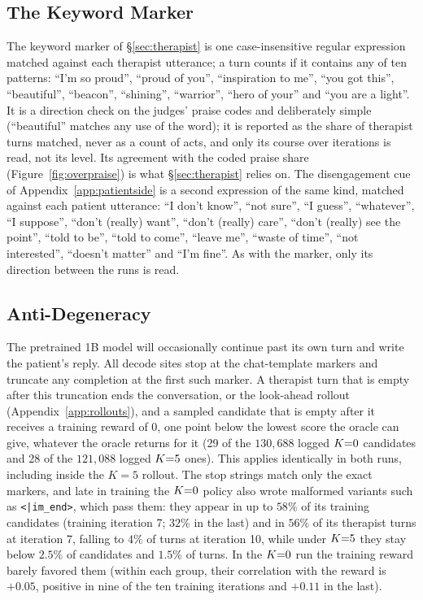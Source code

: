 \subsection{The Keyword Marker}
\label{app:marker}

The keyword marker of \S\ref{sec:therapist} is one case-insensitive regular expression matched against
each therapist utterance; a turn counts if it contains any of ten patterns: ``I'm so proud'',
``proud of you'', ``inspiration to me'', ``you got this'', ``beautiful'', ``beacon'',
``shining'', ``warrior'', ``hero of your'' and ``you are a light''. It
is a direction check on the judges' praise codes and deliberately simple
(``beautiful'' matches any use of the word); it is reported as the share of therapist turns
matched, never as a count of acts, and only its course over iterations is read, not its level. Its agreement with
the coded praise share (Figure~\ref{fig:overpraise}) is what \S\ref{sec:therapist} relies on.
The disengagement cue of Appendix~\ref{app:patientside} is a second expression of the same kind,
matched against each patient utterance: ``I don't know'', ``not sure'', ``I guess'', ``whatever'',
``I suppose'', ``don't (really) want'', ``don't (really) care'', ``don't (really) see the point'',
``told to be'', ``told to come'', ``leave me'', ``waste of time'', ``not interested'', ``doesn't
matter'' and ``I'm fine''. As with the marker, only its direction between the runs is read.

\subsection{Anti-Degeneracy}

The pretrained 1B model will occasionally continue past its own turn and write the patient's reply. All
decode sites stop at the chat-template markers and truncate any completion at the first such
marker. A therapist turn that is empty after this truncation ends the conversation, or the
look-ahead rollout (Appendix~\ref{app:rollouts}), and a sampled candidate that is empty after it receives a training reward of 0,
one point below the lowest score the oracle can give, whatever the oracle returns for it (29 of
the $130{,}688$ logged $K{=}0$ candidates and 28 of the $121{,}088$ logged $K{=}5$ ones). This applies identically in both runs, including
inside the $K{=}5$ rollout. The stop strings match only the exact markers, and late in training
the $K{=}0$ policy also wrote malformed variants such as \texttt{<|im\_end>}, which pass them:
they appear in up to $58\%$ of its training candidates (training iteration 7; $32\%$ in the last)
and in $56\%$ of its therapist turns at iteration 7, falling to $4\%$ of turns at iteration 10,
while under $K{=}5$ they stay below $2.5\%$ of candidates and $1.5\%$ of turns. In the $K{=}0$ run the
training reward barely favored them (within each group, their correlation with the reward is
$+0.05$, positive in nine of the ten training iterations and $+0.11$ in the last).

